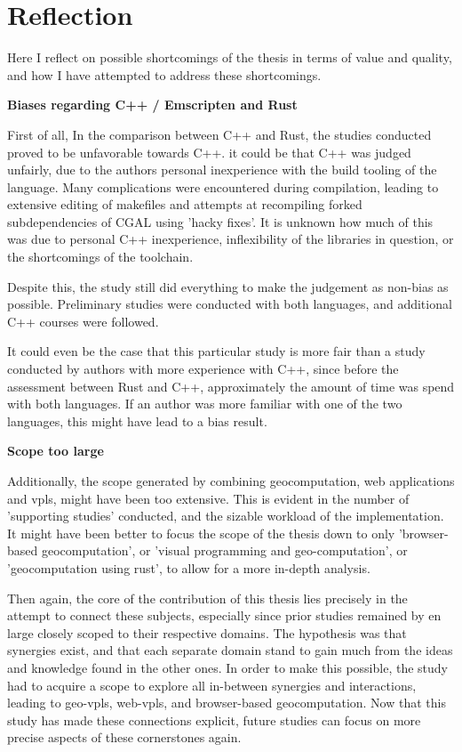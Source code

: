 



\section{Reflection}
\label{sec:reflection}

Here I reflect on possible shortcomings of the thesis in terms of value and quality, and how I have attempted to address these shortcomings. 

\textbf{Biases regarding C++ / Emscripten and Rust}

First of all, In the comparison between C++ and Rust, the studies conducted proved to be unfavorable towards C++. 
it could be that C++ was judged unfairly, due to the authors personal inexperience with the build tooling of the language. 
Many complications were encountered during compilation, leading to extensive editing of makefiles and attempts at recompiling forked subdependencies of CGAL using 'hacky fixes'.  
It is unknown how much of this was due to personal C++ inexperience, inflexibility of the libraries in question, or the shortcomings of the toolchain. 

Despite this, the study still did everything to make the judgement as non-bias as possible.
Preliminary studies were conducted with both languages, and additional C++ courses were followed. 

It could even be the case that this particular study is more fair than a study conducted by authors with more experience with C++, since before the assessment between Rust and C++, approximately the amount of time was spend with both languages. 
If an author was more familiar with one of the two languages, this might have lead to a bias result. 

\textbf{Scope too large}

Additionally, the scope generated by combining geocomputation, web applications and vpls, might have been too extensive. 
This is evident in the number of 'supporting studies' conducted, and the sizable workload of the implementation.
It might have been better to focus the scope of the thesis down to only 'browser-based geocomputation', or 'visual programming and geo-computation', or 'geocomputation using rust', to allow for a more in-depth analysis.

Then again, the core of the contribution of this thesis lies precisely in the attempt to connect these subjects,
especially since prior studies remained by en large closely scoped to their respective domains.
The hypothesis was that synergies exist, and that each separate domain stand to gain much from the ideas and knowledge found in the other ones. 
In order to make this possible, the study had to acquire a scope to explore all in-between synergies and interactions, leading to geo-vpls, web-vpls, and browser-based geocomputation. 
Now that this study has made these connections explicit, future studies can focus on more precise aspects of these cornerstones again.

